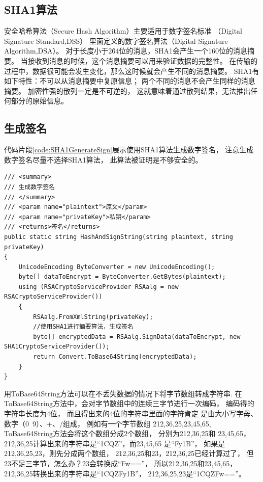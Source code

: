 \documentclass{book}
\begin{document}
\subsection{SHA1算法}

安全哈希算法（Secure Hash Algorithm）主要适用于数字签名标准 （Digital Signature Standard,DSS）
里面定义的数字签名算法（Digital Signature Algorithm,DSA）。
对于长度小于2\^64位的消息，SHA1会产生一个160位的消息摘要。
当接收到消息的时候，这个消息摘要可以用来验证数据的完整性。
在传输的过程中，数据很可能会发生变化，那么这时候就会产生不同的消息摘要。 
SHA1有如下特性：不可以从消息摘要中复原信息；
两个不同的消息不会产生同样的消息摘要。
加密性强的散列一定是不可逆的，
这就意味着通过散列结果，无法推出任何部分的原始信息。

\subsection{生成签名}

代码片段\ref{code:SHA1GenerateSign}展示使用SHA1算法生成数字签名，
注意生成数字签名尽量不选择SHA1算法，
此算法被证明是不够安全的。

\begin{lstlisting}[language={[Sharp]C},caption=采用SHA1算法生成数字签名,label={code:SHA1GenerateSign}]
/// <summary>
/// 生成数字签名
/// </summary>
/// <param name="plaintext">原文</param>
/// <param name="privateKey">私钥</param>
/// <returns>签名</returns>
public static string HashAndSignString(string plaintext, string privateKey)
{
    UnicodeEncoding ByteConverter = new UnicodeEncoding();
    byte[] dataToEncrypt = ByteConverter.GetBytes(plaintext);
    using (RSACryptoServiceProvider RSAalg = new RSACryptoServiceProvider())
    {
        RSAalg.FromXmlString(privateKey);
        //使用SHA1进行摘要算法，生成签名
        byte[] encryptedData = RSAalg.SignData(dataToEncrypt, new SHA1CryptoServiceProvider());
        return Convert.ToBase64String(encryptedData);
    }
}
\end{lstlisting}

用ToBase64String方法可以在不丢失数据的情况下将字节数组转成字符串.
在ToBase64String方法中，会对字节数组中的连续三字节进行一次编码，
编码得的字符串长度为4位，
而且得出来的4位的字符串里面的字符肯定
是由大小写字母、数字（0~9）、+、/组成，
例如有一个字节数组 {212,36,25,23,45,65},
ToBase64String方法会将这个数组分成2个数组，
分别为{212,36,25}和 {23,45,65}，
{212,36,25}计算出来的字符串是“1CQZ”，而{23,45,65} 是“Fy1B”，
如果是{212,36,25,23}，则先分成两个数组，
{212,36,25}和{23}，{212,36,25}已经计算过了，
但{23}不足三字节，怎么办？{23}会转换成“Fw==”，
所以{212,36,25}和{23,45,65}，
{212,36,25}转换出来的字符串是“1CQZFy1B”，
{212,36,25,23}是“1CQZFw==”。
\end{document}
